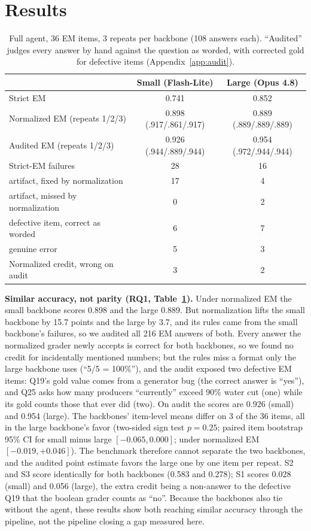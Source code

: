 \documentclass{article}
\begin{document}
\section{Results}
\label{sec:results}

\begin{table}[t]
  \centering
  \small
  \caption{Full agent, 36 EM items, 3 repeats per backbone (108 answers each).
  ``Audited'' judges every answer by hand against the question as worded, with
  corrected gold for defective items (Appendix~\ref{app:audit}).}
  \label{tab:audit}
  \begin{tabular}{lcc}
    \toprule
    & Small (Flash-Lite) & Large (Opus 4.8) \\
    \midrule
    Strict EM & 0.741 & 0.852 \\
    Normalized EM (repeats 1/2/3) & 0.898 (.917/.861/.917) & 0.889 (.889/.889/.889) \\
    Audited EM (repeats 1/2/3) & 0.926 (.944/.889/.944) & 0.954 (.972/.944/.944) \\
    \midrule
    Strict-EM failures & 28 & 16 \\
    \quad artifact, fixed by normalization & 17 & 4 \\
    \quad artifact, missed by normalization & 0 & 2 \\
    \quad defective item, correct as worded & 6 & 7 \\
    \quad genuine error & 5 & 3 \\
    Normalized credit, wrong on audit & 3 & 2 \\
    \bottomrule
  \end{tabular}
\end{table}

\textbf{Similar accuracy, not parity (RQ1, Table~\ref{tab:audit}).} Under
normalized EM the small backbone scores 0.898 and the large 0.889. But
normalization lifts the small backbone by 15.7 points and the large by 3.7,
and its rules came from the small backbone's failures, so we audited all 216
EM answers of both. Every answer the normalized grader newly accepts is
correct for both backbones, so we found no credit for incidentally mentioned
numbers; but the rules miss a format only the large backbone uses (``5/5 =
100\%''), and the audit exposed two defective EM items: Q19's gold value comes
from a generator bug (the correct answer is ``yes''), and Q25 asks how many
producers ``currently'' exceed 90\% water cut (one) while its gold counts those
that ever did (two). On audit the scores are 0.926 (small) and 0.954 (large).
The backbones' item-level means differ on 3 of the 36 items, all in the large
backbone's favor (two-sided sign test $p=0.25$; paired item bootstrap 95\% CI
for small minus large $[-0.065, 0.000]$; under normalized EM $[-0.019,
+0.046]$). The benchmark therefore cannot separate the two backbones, and the
audited point estimate favors the large one by one item per repeat. S2 and S3
score identically for both backbones (0.583 and 0.278); S1 scores 0.028 (small)
and 0.056 (large), the extra credit being a non-answer to the defective Q19
that the boolean grader counts as ``no''. Because the backbones also tie
without the agent, these results show both reaching similar accuracy through
the pipeline, not the pipeline closing a gap measured here.
\end{document}
